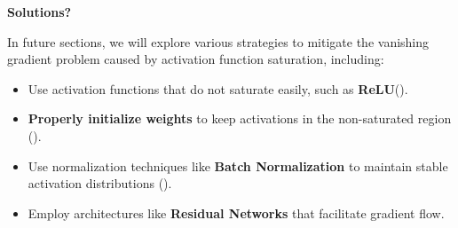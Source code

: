 \highspace
\begin{flushleft}
    \textcolor{Green3}{ \textbf{Solutions?}}
\end{flushleft}
In future sections, we will explore various strategies to mitigate the vanishing gradient problem caused by activation function saturation, including:
\begin{itemize}
    \item Use activation functions that do not saturate easily, such as \textbf{ReLU}\break ().
    \item \textbf{Properly initialize weights} to keep activations in the non-saturated region ().
    \item Use normalization techniques like \textbf{Batch Normalization} to maintain stable activation distributions ().
    \item Employ architectures like \textbf{Residual Networks} that facilitate gradient flow.
\end{itemize}

